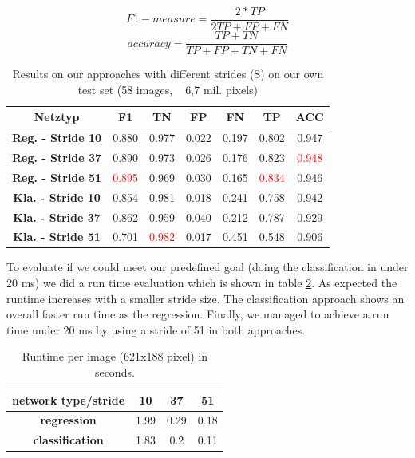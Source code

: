 \begin{equation} \label{eq:fMeasure}
F1-measure = \frac{2*TP}{2TP +FP +FN}
\end{equation}
\begin{equation} \label{eq:accuracy}
accuracy = \frac{TP + TN}{TP + FP + TN + FN}
\end{equation}

\begin{table}[h!]
  \begin{center}
    \label{tab:ownapproach}
    \begin{tabular}{c|cccccc}
    \toprule
      \textbf{Netztyp} & {\bf F1} & \textbf{TN} & \textbf{FP} & \textbf{FN} & \textbf{TP} & \textbf{ACC} \\
       \midrule
      \textbf{Reg. - Stride 10} & 0.880 & 0.977 & 0.022 & 0.197 & 0.802 & 0.947\\
      \textbf{Reg. - Stride 37} & 0.890 & 0.973 & 0.026 & 0.176 & 0.823 &  \textcolor{red}{0.948}\\ 
      \textbf{Reg. - Stride 51} & \textcolor{red}{0.895} & 0.969 & 0.030 & 0.165 & \textcolor{red}{0.834} & 0.946\\
      \midrule
      \textbf{Kla. - Stride 10} & 0.854 & 0.981 & 0.018 & 0.241 & 0.758 & 0.942\\
      \textbf{Kla. - Stride 37} & 0.862 & 0.959 & 0.040 & 0.212 & 0.787 & 0.929\\
      \textbf{Kla. - Stride 51} & 0.701 & \textcolor{red}{0.982} & 0.017 & 0.451 & 0.548 & 0.906\\
      \bottomrule
    \end{tabular}
    \caption{Results on our approaches with different strides (S) on our own test set (58 images, ~ 6,7 mil. pixels)}
  \end{center}
\end{table}

To evaluate if we could meet our predefined goal (doing the classification in under 20 ms) we did a run time evaluation which is shown in table \ref{tab:runtime}. As expected the runtime increases with a smaller stride size. The classification approach shows an overall faster run time as the regression. Finally, we managed to achieve a run time under 20 ms by using a stride of 51 in both approaches.



 \begin{table}[h!]
  \begin{center}
  \label{tab:runtime}
    \begin{tabular}{c|ccc}
    \toprule
      \textbf{network type/stride} & \textbf{10} & \textbf{37} & \textbf{51} \\
     \midrule
      \textbf{regression} & 1.99 & 0.29 & 0.18 \\
      \textbf{classification} & 1.83 & 0.2 & 0.11\\
      \bottomrule
    \end{tabular}
        \caption{Runtime per image (621x188 pixel) in seconds.}
  \end{center}
\end{table}


